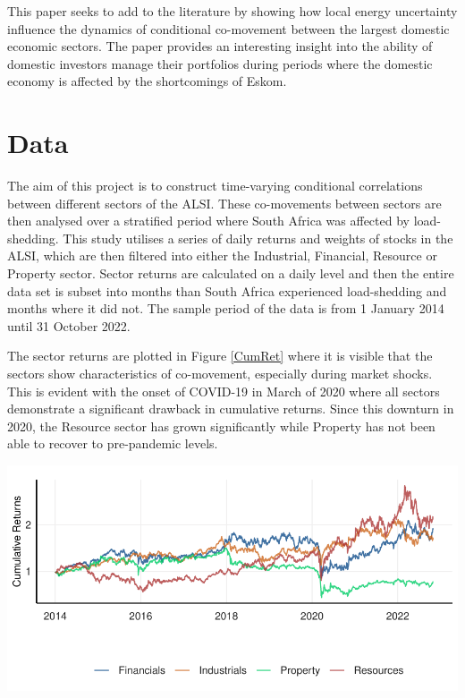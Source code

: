 \documentclass[11pt,preprint, authoryear]{elsarticle}
\let\origfigure\figure
\let\endorigfigure\endfigure
\renewenvironment{figure}[1][2] {
    \expandafter\origfigure\expandafter[H]
} {
    \endorigfigure
}
\numberwithin{equation}{section}
\numberwithin{figure}{section}
\numberwithin{table}{section}
\begin{document}
This paper seeks to add to the literature by showing how local energy
uncertainty influence the dynamics of conditional co-movement between
the largest domestic economic sectors. The paper provides an interesting
insight into the ability of domestic investors manage their portfolios
during periods where the domestic economy is affected by the
shortcomings of Eskom.

\hypertarget{data}{%
\section{\texorpdfstring{Data \label{Data}}{Data }}\label{data}}

The aim of this project is to construct time-varying conditional
correlations between different sectors of the ALSI. These co-movements
between sectors are then analysed over a stratified period where South
Africa was affected by load-shedding. This study utilises a series of
daily returns and weights of stocks in the ALSI, which are then filtered
into either the Industrial, Financial, Resource or Property sector.
Sector returns are calculated on a daily level and then the entire data
set is subset into months than South Africa experienced load-shedding
and months where it did not. The sample period of the data is from 1
January 2014 until 31 October 2022.

The sector returns are plotted in Figure \ref{CumRet} where it is
visible that the sectors show characteristics of co-movement, especially
during market shocks. This is evident with the onset of COVID-19 in
March of 2020 where all sectors demonstrate a significant drawback in
cumulative returns. Since this downturn in 2020, the Resource sector has
grown significantly while Property has not been able to recover to
pre-pandemic levels.

\begin{figure}[H]

{\centering \includegraphics{Paper_files/figure-latex/CumRet-1} 

}

\caption{Cumulative Returns per Sector for ALSI and SWIX \label{CumRet}}\label{fig:CumRet}
\end{figure}
\end{document}
